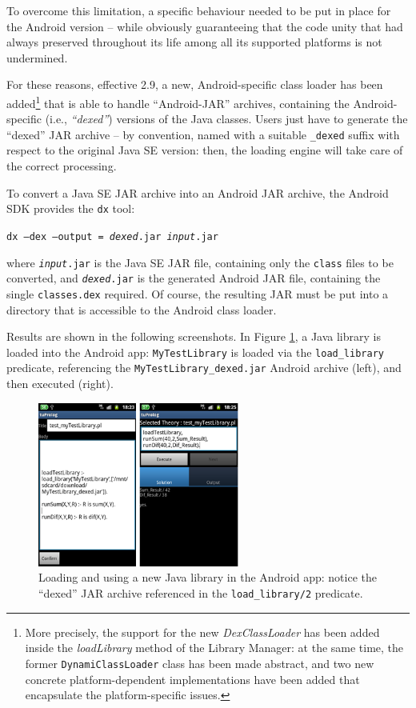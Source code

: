 To overcome this limitation, a specific behaviour needed to be put in place for the Android version -- while obviously guaranteeing that the code unity that \tuprolog{} had always preserved throughout its life among all its supported platforms is not undermined.

For these reasons, effective \tuprolog{} 2.9, a new, Android-specific class loader has been added\footnote{%
    More precisely, the support for the new \textit{DexClassLoader} has been added inside the \textit{loadLibrary} method of the Library Manager: at the same time, the former \texttt{DynamiClassLoader} class has been made abstract, and two new concrete platform-dependent implementations have been added that encapsulate the platform-specific issues.}%
that is able to handle ``Android-JAR'' archives, containing the Android-specific (i.e., \textit{``dexed''}) versions of the Java classes.
Users just have to generate the ``dexed'' JAR archive -- by convention, named with a suitable \texttt{\_dexed} suffix with respect to the original Java SE version: then, the \tuprolog{} loading engine will take care of the correct processing.

To convert a Java SE JAR archive into an Android JAR archive, the Android SDK provides the \texttt{dx} tool:

\begin{center}
\texttt{dx --dex --output = \textit{dexed}.jar \textit{input}.jar}
\end{center}

\noindent where \texttt{\textit{input}.jar} is the Java SE JAR file, containing only the \texttt{class} files to be converted, and \texttt{\textit{dexed}.jar} is the generated Android JAR file, containing the single \texttt{classes.dex} required.
%
Of course, the resulting JAR must be put into a directory that is accessible to the Android class loader.

Results are shown in the following screenshots.
%
In Figure \ref{fig:android9a}, a Java library is loaded into the Android app: \texttt{MyTestLibrary} is loaded via the \texttt{load\_library} predicate, referencing the \texttt{MyTestLibrary\_dexed.jar} Android archive (left), and then executed (right).
%
\begin{figure}
\centering
  \includegraphics[width=250px]{images/android9a.png}
  \caption{Loading and using a new Java library in the Android app: notice the ``dexed'' JAR archive referenced in the \texttt{load\_library/2} predicate.}\label{fig:android9a}
\end{figure}


